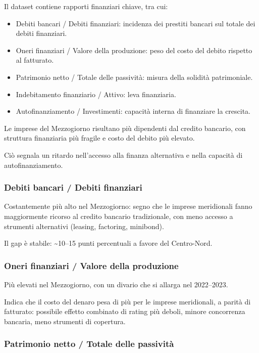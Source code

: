 \documentclass[
  letterpaper,
  DIV=11,
  numbers=noendperiod]{scrartcl}
\providecommand{\tightlist}{%
  \setlength{\itemsep}{0pt}\setlength{\parskip}{0pt}}
\begin{document}
Il dataset contiene rapporti finanziari chiave, tra cui:

\begin{itemize}
\tightlist
\item
  Debiti bancari / Debiti finanziari: incidenza dei prestiti bancari sul
  totale dei debiti finanziari.
\item
  Oneri finanziari / Valore della produzione: peso del costo del debito
  rispetto al fatturato.
\item
  Patrimonio netto / Totale delle passività: misura della solidità
  patrimoniale.
\item
  Indebitamento finanziario / Attivo: leva finanziaria.
\item
  Autofinanziamento / Investimenti: capacità interna di finanziare la
  crescita.
\end{itemize}

Le imprese del Mezzogiorno risultano più dipendenti dal credito
bancario, con struttura finanziaria più fragile e costo del debito più
elevato.

Ciò segnala un ritardo nell'accesso alla finanza alternativa e nella
capacità di autofinanziamento.

\subsubsection{Debiti bancari / Debiti
finanziari}\label{debiti-bancari-debiti-finanziari}

Costantemente più alto nel Mezzogiorno: segno che le imprese meridionali
fanno maggiormente ricorso al credito bancario tradizionale, con meno
accesso a strumenti alternativi (leasing, factoring, minibond).

Il gap è stabile: \textasciitilde10--15 punti percentuali a favore del
Centro-Nord.

\subsubsection{Oneri finanziari / Valore della
produzione}\label{oneri-finanziari-valore-della-produzione}

Più elevati nel Mezzogiorno, con un divario che si allarga nel
2022--2023.

Indica che il costo del denaro pesa di più per le imprese meridionali, a
parità di fatturato: possibile effetto combinato di rating più deboli,
minore concorrenza bancaria, meno strumenti di copertura.

\subsubsection{Patrimonio netto / Totale delle
passività}\label{patrimonio-netto-totale-delle-passivituxe0}
\end{document}

